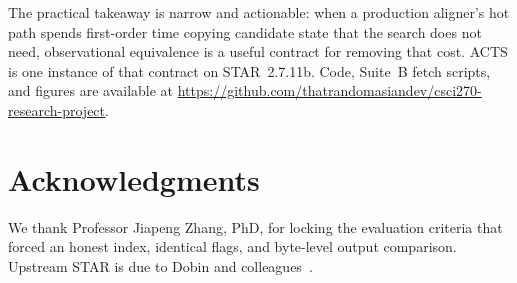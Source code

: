 \documentclass[11pt]{article}
\newcommand{\STAR}{STAR\xspace}
\newcommand{\ACTS}{ACTS\xspace}
\begin{document}
The practical takeaway is narrow and actionable: when a production aligner's
hot path spends first-order time copying candidate state that the search does
not need, observational equivalence is a useful contract for removing that
cost.
\ACTS is one instance of that contract on \STAR~2.7.11b.
Code, Suite~B fetch scripts, and figures are available at
\url{https://github.com/thatrandomasiandev/csci270-research-project}.

\section*{Acknowledgments}

We thank Professor Jiapeng Zhang, PhD, for locking the evaluation criteria that forced an
honest index, identical flags, and byte-level output comparison.
Upstream \STAR is due to Dobin and colleagues~\cite{dobin2013star,dobin2015mapping}.



\end{document}
